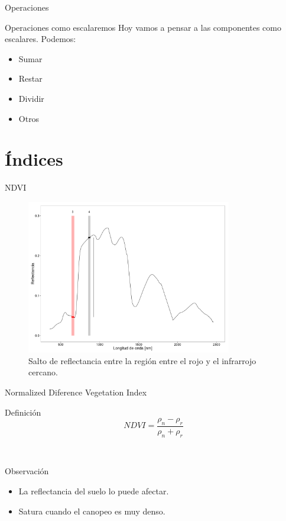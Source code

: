 \documentclass[handout]{beamer}
\begin{document}
\begin{frame}{Operaciones}
  \begin{block}{Operaciones como escalaremos}
    Hoy vamos a pensar a las componentes como escalares. Podemos:
    \begin{itemize}[<+->]
      \item Sumar
      \item Restar
      \item Dividir
      \item Otros
    \end{itemize}
  \end{block}
\end{frame}
\section{Índices}
\begin{frame}{NDVI}
    \begin{figure}
    \centering
    \includegraphics[width=0.8\textwidth]{imagenes/salto_nr.png}
    \caption{Salto de reflectancia entre la región entre el rojo y el infrarrojo cercano.}
    \end{figure}
\end{frame}
\begin{frame}{Normalized Diference Vegetation Index}
  \begin{block}{Definición}
      \begin{equation}
          NDVI = \frac{\rho_n-\rho_r}{\rho_n+\rho_r}
      \end{equation}
  \end{block}\pause\
    \begin{block}{Observación}
        \begin{itemize}[<+->]
            \item La reflectancia del suelo lo puede afectar.
            \item Satura cuando el canopeo es muy denso.
        \end{itemize}
    \end{block}
\end{frame}
\end{document}
